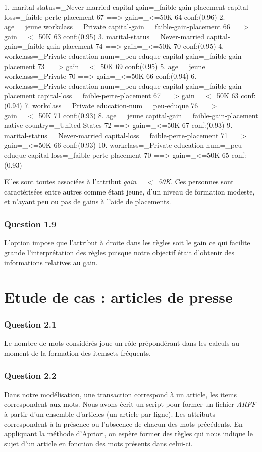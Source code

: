 \documentclass[a4paper,12pt]{article}
\begin{document}
 1.  marital-status=_Never-married  capital-gain=_faible-gain-placement  capital-loss=_faible-perte-placement 67 ==>  gain=_<=50K 64    conf:(0.96)
 2. age=_jeune  workclass=_Private  capital-gain=_faible-gain-placement 66 ==>  gain=_<=50K 63    conf:(0.95)
 3.  marital-status=_Never-married  capital-gain=_faible-gain-placement 74 ==>  gain=_<=50K 70    conf:(0.95)
 4.  workclass=_Private  education-num=_peu-eduque  capital-gain=_faible-gain-placement 73 ==>  gain=_<=50K 69    conf:(0.95)
 5. age=_jeune  workclass=_Private 70 ==>  gain=_<=50K 66    conf:(0.94)
 6.  workclass=_Private  education-num=_peu-eduque  capital-gain=_faible-gain-placement  capital-loss=_faible-perte-placement 67 ==>  gain=_<=50K 63    conf:(0.94)
 7.  workclass=_Private  education-num=_peu-eduque 76 ==>  gain=_<=50K 71    conf:(0.93)
 8. age=_jeune  capital-gain=_faible-gain-placement  native-country=_United-States 72 ==>  gain=_<=50K 67    conf:(0.93)
 9.  marital-status=_Never-married  capital-loss=_faible-perte-placement 71 ==>  gain=_<=50K 66    conf:(0.93)
10.  workclass=_Private  education-num=_peu-eduque  capital-loss=_faible-perte-placement 70 ==>  gain=_<=50K 65    conf:(0.93)

Elles sont toutes associées à l'attribut \textit{gain=_<=50K}. Ces personnes sont caractérisées entre autres comme étant jeune, d'un niveau de formation modeste, et n'ayant peu ou pas de gains à l'aide de placements.

\subsubsection{Question 1.9}
L'option  impose que l'attribut à droite dans les règles soit le gain ce qui facilite grande l'interprétation des règles puisque notre objectif était d'obtenir des informations relatives au gain.

\section{Etude de cas : articles de presse}
\subsubsection*{Question 2.1}
Le nombre de mots considérés joue un rôle prépondérant dans les calculs au moment de la formation des itemsets fréquents.

\subsubsection*{Question 2.2}
Dans notre modélisation, une transaction correspond à un article, les items correspondent aux mots. Nous avons écrit un script pour former un fichier \textit{ARFF} à partir d'un ensemble d'articles (un article par ligne). Les attributs correspondent à la présence ou l'abscence de chacun des mots précédents. En appliquant la méthode d'Apriori, on espère former des règles qui nous indique le sujet d'un article en fonction des mots présents dans celui-ci.
\end{document}
